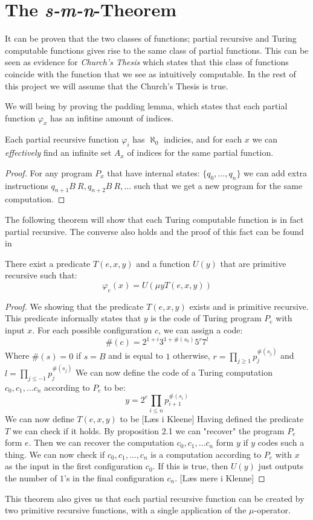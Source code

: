 \documentclass[../main.tex]{subfiles}
\begin{document}
\section{The \textit{s-m-n}-Theorem}

It can be proven that the two classes of functions; partial recursive and Turing
computable functions gives rise to the same class of partial functions. This
can be seen as evidence for \textit{Church's Thesis} which states that this
class of functions coincide with the function that we see as intuitively
computable. In the rest of this project we will assume that the Church's Thesis
is true.

We will being by proving the padding lemma, which states that each partial
function $\varphi_x$ has an infitine amount of indices.
\begin{lem}
	Each partial recursive function $\varphi_i$ has $\aleph_0$ indicies,
	and for each $x$ we can \textit{effectively} find an infinite set $A_x$
	of indices for the same partial function.
\end{lem}
\begin{proof}
	For any program $P_x$ that have internal states: $\{q_0,\ldots, q_n\}$
	we can add extra instructions $q_{n+1}B\ R ,q_{n+2}B\ R,\ldots$ such
	that we get a new program for the same computation.
\end{proof}

The following theorem will show that each Turing computable function is in fact
partial recursive. The converse also holds and the proof of this fact can be
found in \parencite{Kleene1952}

\begin{thm}
	\label{thm:Normalform}
	There exist a predicate $T(e,x,y)$ and a function $U(y)$ that are
	primitive recursive such that:
	$$\varphi_e(x)=U(\mu yT(e,x,y))$$
\end{thm}
\begin{proof}
	We showing that the predicate $T(e,x,y)$ exists and is primitive
	recursive. This predicate informally
	states that $y$ is the code of Turing program $P_e$ with input $x$. For
	each possible configuration $c$, we can assign a code:
	$$\#(c)=2^{1+i}3^{1+\#(s_0)}5^r7^l$$
	Where $\#(s)=0$ if $s=B$ and is equal to $1$ otherwise, $r=\prod_{j\geq
	1}p_j^{\#(s_j)}$ and $l=\prod_{j\leq -1}p_j^{\#(s_j)}$
	 We can now define the code of a Turing computation
	$c_0,c_1,\ldots c_n$ according to $P_e$ to be:
	$$y=2^e\prod_{i\leq n}p_{i+1}^{\#(s_i)}$$
	We can now define $T(e,x,y)$ to be [Læs i Kleene]
	Having defined the predicate $T$ we can check if it holds. By
	proposition 2.1 we can "recover" the program $P_e$ form $e$. Then we
	can recover the computation $c_0,c_1,\ldots c_n$ form $y$ if $y$ codes
	such a thing. We can now check if $c_0,c_1,\ldots,c_n$ is a computation
	according to $P_e$ with $x$ as the input in the first configuration
	$c_0$. If this is true, then $U(y)$ just outputs the number of $1$'s in
	the final configuration $c_n$. [Læs mere i Klenne]
\end{proof}
This theorem also gives us that each partial recursive function can be created
by two primitive recursive functions, with a single application of the
$\mu$-operator.
\end{document}
